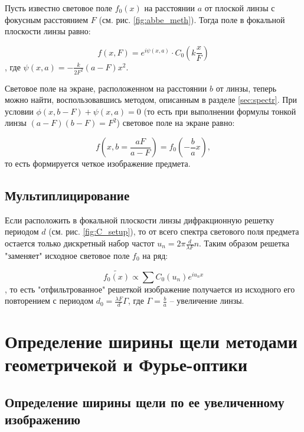\documentclass[a4paper,12pt]{article} %
\begin{document}
Пусть известно световое поле $f_0(x)$ на расстоянии $a$ от плоской линзы с фокусным расстоянием $F$ (см. рис. \ref{fig:abbe_meth}). Тогда поле в фокальной плоскости линзы равно:

\begin{equation}
    f(x, F) = e^{i\psi(x, a)} \cdot C_0(k\frac{x}{F})
    \label{eq:focal_field}
\end{equation}
, где $\psi(x, a) = -\frac{k}{2 F^2}(a - F)x^2$. 

Световое поле на экране, расположенном на расстоянии $b$ от линзы, теперь можно найти, воспользовавшись методом, описанным в разделе \ref{sec:spectr}. При условии $\phi(x, b - F) + \psi(x, a) = 0$ (то есть при выполнении формулы тонкой линзы $(a - F)(b - F) = F^2$) световое поле на экране равно:

\begin{equation}
    f(x, b = \frac{aF}{a - F}) = f_0(- \frac{b}{a} x),
\end{equation}
то есть формируется четкое изображение предмета.

\clearpage

\subsection{Мультиплицирование}
\label{sec:th_mult}
Если расположить в фокальной плоскости линзы дифракционную решетку периодом $d$ (см. рис. \ref{fig:C_setup}), то от всего спектра светового поля предмета остается только дискретный набор частот $u_n = 2\pi \frac{d}{\lambda F} n$. Таким образом решетка "заменяет" исходное световое поле $f_0$ на ряд:

\begin{equation}
    \tilde{f_0(x)} \propto \sum C_0(u_n) e^{i u_n x}
\end{equation}
, то есть "отфильтрованное" решеткой изображение получается из исходного его повторением с периодом $\boxed{d_0 = \frac{\lambda F}{d} \Gamma}$, где $\Gamma = \frac{b}{a}$ -- увеличение линзы.


\section{Определение ширины щели методами геометричекой и Фурье-оптики}

\subsection{ Определение ширины щели по ее увеличенному изображению}
\end{document}
